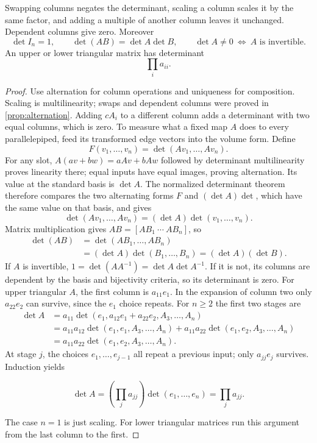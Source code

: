 \begin{theorem}
\label{thm:determinant-properties}
Swapping columns negates the determinant, scaling a column scales it by
the same factor, and adding a multiple of another column leaves it unchanged.
Dependent columns give zero. Moreover
\[
\det I_n=1,\qquad\det(AB)=\det A\det B,\qquad
\det A\ne0\ \Longleftrightarrow\ A\text{ is invertible}.
\]
An upper or lower triangular matrix has determinant
\[
\prod_i a_{ii}.
\]

\end{theorem}
\begin{proof}
Use alternation for column operations and uniqueness for
composition. Scaling is multilinearity; swaps and dependent columns were
proved in \cref{prop:alternation}. Adding $cA_i$ to a different column
adds a determinant with two equal columns, which is zero.
To measure what a fixed map $A$ does to every parallelepiped, feed
its transformed edge vectors into the volume form. Define
\[
F(v_1,\ldots,v_n)=\det(Av_1,\ldots,Av_n).
\]
For any slot, $A(av+bw)=aAv+bAw$ followed by determinant multilinearity
proves linearity there; equal inputs have equal images, proving alternation.
Its value at the standard basis is $\det A$. The normalized determinant
theorem therefore compares the two alternating forms $F$ and
$(\det A)\det$, which have the same value on that basis, and gives
\[
\det(Av_1,\ldots,Av_n)=(\det A)\det(v_1,\ldots,v_n).
\]
Matrix multiplication gives $AB=[AB_1\ \cdots\ AB_n]$, so
\[
\begin{aligned}
\det(AB)&=\det(AB_1,\ldots,AB_n)\\
&=(\det A)\det(B_1,\ldots,B_n)=(\det A)(\det B).
\end{aligned}
\]
If $A$ is invertible, $1=\det(AA^{-1})=\det A\det A^{-1}$.
If it is not, its columns are dependent by the basis and bijectivity
criteria, so its determinant is zero.
For upper triangular $A$, the first column is $a_{11}e_1$.
In the expansion of column two only $a_{22}e_2$ can survive, since the
$e_1$ choice repeats. For $n\geq2$ the first two stages are
\[
\begin{aligned}
\det A&=a_{11}\det(e_1,a_{12}e_1+a_{22}e_2,A_3,\ldots,A_n)\\
&=a_{11}a_{12}\det(e_1,e_1,A_3,\ldots,A_n)
+a_{11}a_{22}\det(e_1,e_2,A_3,\ldots,A_n)\\
&=a_{11}a_{22}\det(e_1,e_2,A_3,\ldots,A_n).
\end{aligned}
\]
At stage $j$, the choices $e_1,\ldots,e_{j-1}$ all repeat a previous
input; only $a_{jj}e_j$ survives. Induction yields

\[
\det A=(\prod_j a_{jj})\det(e_1,\ldots,e_n)=\prod_j a_{jj}.
\]

The case $n=1$ is just scaling. For lower triangular matrices run this argument
from the last column to the first.
\end{proof}

